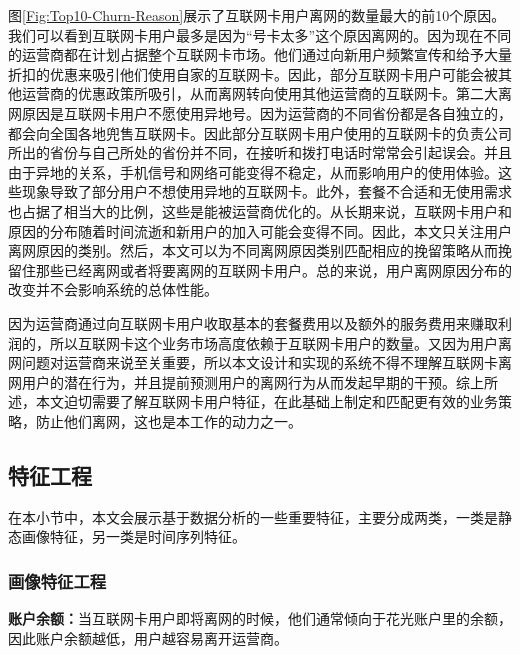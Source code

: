 图\ref{Fig:Top10-Churn-Reason}展示了互联网卡用户离网的数量最大的前10个原因。我们可以看到互联网卡用户最多是因为“号卡太多”这个原因离网的。因为现在不同的运营商都在计划占据整个互联网卡市场。他们通过向新用户频繁宣传和给予大量折扣的优惠来吸引他们使用自家的互联网卡。因此，部分互联网卡用户可能会被其他运营商的优惠政策所吸引，从而离网转向使用其他运营商的互联网卡。第二大离网原因是互联网卡用户不愿使用异地号。因为运营商的不同省份都是各自独立的，都会向全国各地兜售互联网卡。因此部分互联网卡用户使用的互联网卡的负责公司所出的省份与自己所处的省份并不同，在接听和拨打电话时常常会引起误会。并且由于异地的关系，手机信号和网络可能变得不稳定，从而影响用户的使用体验。这些现象导致了部分用户不想使用异地的互联网卡。此外，套餐不合适和无使用需求也占据了相当大的比例，这些是能被运营商优化的。从长期来说，互联网卡用户和原因的分布随着时间流逝和新用户的加入可能会变得不同。因此，本文只关注用户离网原因的类别。然后，本文可以为不同离网原因类别匹配相应的挽留策略从而挽留住那些已经离网或者将要离网的互联网卡用户。总的来说，用户离网原因分布的改变并不会影响系统的总体性能。\par
因为运营商通过向互联网卡用户收取基本的套餐费用以及额外的服务费用来赚取利润的，所以互联网卡这个业务市场高度依赖于互联网卡用户的数量。又因为用户离网问题对运营商来说至关重要，所以本文设计和实现的系统不得不理解互联网卡离网用户的潜在行为，并且提前预测用户的离网行为从而发起早期的干预。综上所述，本文迫切需要了解互联网卡用户特征，在此基础上制定和匹配更有效的业务策略，防止他们离网，这也是本工作的动力之一。
\par


%
%


\subsection{特征工程}
在本小节中，本文会展示基于数据分析的一些重要特征，主要分成两类，一类是静态画像特征，另一类是时间序列特征。
\subsubsection{画像特征工程}
\textbf{账户余额：}当互联网卡用户即将离网的时候，他们通常倾向于花光账户里的余额，因此账户余额越低，用户越容易离开运营商。\par

